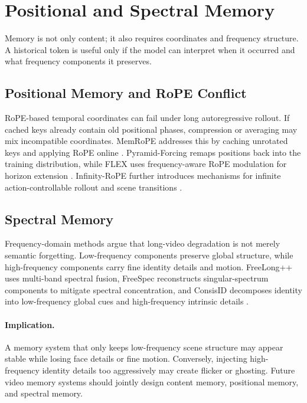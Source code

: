 \section{Positional and Spectral Memory}

Memory is not only content; it also requires coordinates and frequency structure. A historical token is useful only if the model can interpret when it occurred and what frequency components it preserves.

\subsection{Positional Memory and RoPE Conflict}
RoPE-based temporal coordinates can fail under long autoregressive rollout. If cached keys already contain old positional phases, compression or averaging may mix incompatible coordinates. MemRoPE addresses this by caching unrotated keys and applying RoPE online \citep{memrope2026}. Pyramid-Forcing remaps positions back into the training distribution, while FLEX uses frequency-aware RoPE modulation for horizon extension \citep{pyramidforcing2026,flex2026}. Infinity-RoPE further introduces mechanisms for infinite action-controllable rollout and scene transitions \citep{infinityrope2025}.

\subsection{Spectral Memory}
Frequency-domain methods argue that long-video degradation is not merely semantic forgetting. Low-frequency components preserve global structure, while high-frequency components carry fine identity details and motion. FreeLong++ uses multi-band spectral fusion, FreeSpec reconstructs singular-spectrum components to mitigate spectral concentration, and ConsisID decomposes identity into low-frequency global cues and high-frequency intrinsic details \citep{freelongpp2025,freespec2026,consisid2024}.

\paragraph{Implication.} A memory system that only keeps low-frequency scene structure may appear stable while losing face details or fine motion. Conversely, injecting high-frequency identity details too aggressively may create flicker or ghosting. Future video memory systems should jointly design content memory, positional memory, and spectral memory.
